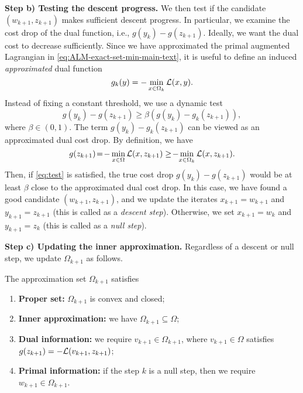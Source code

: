 \documentclass[11pt]{article}
\begin{document}
\noindent
\textbf{Step b) Testing the descent progress.} We then test if the candidate $(w_{k+1},z_{k+1})$ makes sufficient descent progress. In particular, we examine the cost drop of the dual function, i.e.,  
$g(y_{k}) - g(z_{k+1})$. Ideally, we want the dual cost to decrease sufficiently. 
Since we have approximated the primal augmented Lagrangian in \cref{eq:ALM-exact-set-min-main-text}, it is useful to define an induced \textit{approximated} dual function \vspace{-1mm}
\begin{equation} 
\label{eq:approximated-dual}
g_k(y) = - \min_{x\in\Omega_k} \calL(x,y).  \vspace{-1mm}
\end{equation}
Instead of fixing a constant threshold, we use a dynamic test
\begin{equation}
\label{eq:test}
    g(y_{k}) - g(z_{k+1}) \geq \beta (g(y_{k}) - g_k(z_{k+1})),
\end{equation}
where $\beta\! \in\! (0,1)$. The term $g(y_{k}) - g_k(z_{k+1})$  can be viewed as an approximated dual cost drop. By definition, we have \begin{equation}
    \label{eq:g-gk}
    g(z_{k+1}) \!=\! -\min_{x\in \Omega} \mathcal{L}(x,z_{k+1})\geq 
    \!-\!\min_{x\in \Omega_{k}} \mathcal{L}(x,z_{k+1}).
\end{equation} 
Then, if \cref{eq:test} is satisfied, the true cost drop $g(y_k) - g(z_{k+1})$ would be at least $\beta$ close to the approximated dual cost drop. In this case, we have found a good candidate $(w_{k+1},z_{k+1})$, and we update the iterates $x_{k+1} = w_{k+1}$ and $y_{k+1} = z_{k+1}$ (this is called as a \emph{descent step}). Otherwise, we set $x_{k+1} = w_{k}$ and $y_{k+1} = z_{k}$ (this is called as a \emph{null step}).

\vspace{3pt}

\noindent
\textbf{Step c) Updating the inner approximation.} Regardless of a descent or null step, we update $\Omega_{k+1}$ as follows.  

\vspace{-1mm}

\begin{assumption}
    \label{assump:AALM}  
    The approximation set $\Omega_{k+1}$ satisfies \vspace{-3mm}
    
    \begin{enumerate}[leftmargin=*]
    \setlength{\itemsep}{0pt}
    \item \textbf{Proper set:} $\Omega_{k+1}$ is convex and closed;
        \item \textbf{Inner approximation:} we have $\Omega_{k+1} \subseteq \Omega $; \vspace{-0.5mm}
        \item \textbf{Dual information:} we require $v_{k+1} \in \Omega_{k+1}$, where $v_{k+1} \in \Omega$ satisfies $g(z_{k+1}) = - \mathcal{L}(v_{k+1},z_{k+1})$; 
        \item \textbf{Primal information:} if the step $k$ is a null step, then we require $ w_{k+1} \in \Omega_{k+1}$.
    \end{enumerate}
\end{assumption}
\end{document}
